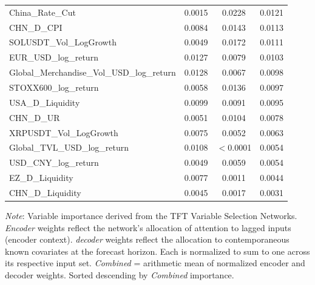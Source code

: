 \begin{tabular}{lccc}
  China\_Rate\_Cut & 0.0015 & 0.0228 & 0.0121 \\ 
  CHN\_D\_CPI & 0.0084 & 0.0143 & 0.0113 \\ 
  SOLUSDT\_Vol\_LogGrowth & 0.0049 & 0.0172 & 0.0111 \\ 
  EUR\_USD\_log\_return & 0.0127 & 0.0079 & 0.0103 \\ 
  Global\_Merchandise\_Vol\_USD\_log\_return & 0.0128 & 0.0067 & 0.0098 \\ 
  STOXX600\_log\_return & 0.0058 & 0.0136 & 0.0097 \\ 
  USA\_D\_Liquidity & 0.0099 & 0.0091 & 0.0095 \\ 
  CHN\_D\_UR & 0.0051 & 0.0104 & 0.0078 \\ 
  XRPUSDT\_Vol\_LogGrowth & 0.0075 & 0.0052 & 0.0063 \\ 
  Global\_TVL\_USD\_log\_return & 0.0108 & $<$0.0001 & 0.0054 \\ 
  USD\_CNY\_log\_return & 0.0049 & 0.0059 & 0.0054 \\ 
  EZ\_D\_Liquidity & 0.0077 & 0.0011 & 0.0044 \\ 
  CHN\_D\_Liquidity & 0.0045 & 0.0017 & 0.0031 \\ 
  \bottomrule
\end{tabular}
\par\vspace{4pt}
\begin{minipage}{\linewidth}
  \footnotesize \textit{Note}: Variable importance derived from the TFT Variable Selection Networks. \textit{Encoder} weights reflect the network's allocation of attention to lagged inputs (encoder context). \textit{decoder} weights reflect the allocation to contemporaneous known covariates at the forecast horizon. Each is normalized to sum to one across its respective input set. \textit{Combined} = arithmetic mean of normalized encoder and decoder weights. Sorted descending by \textit{Combined} importance.
\end{minipage}